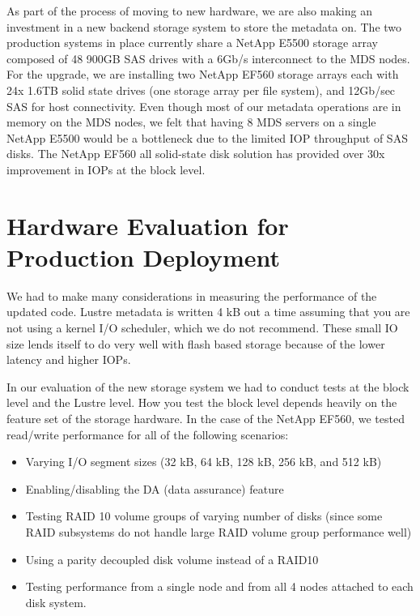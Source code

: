 \documentclass[conference,compsoc]{IEEEtran}
\begin{document}
As part of the process of moving to new hardware, we are also making an
investment in a new backend storage system to store the metadata on. The two
production systems in place currently share a NetApp E5500 storage array
composed of 48 900GB SAS drives with a 6Gb/s interconnect to the MDS nodes. For
the upgrade, we are installing two NetApp EF560 storage arrays each with 24x
1.6TB solid state drives (one storage array per file system), and 12Gb/sec SAS
for host connectivity. Even though most of our metadata operations are in
memory on the MDS nodes, we felt that having 8 MDS servers on a single NetApp
E5500 would be a bottleneck due to the limited IOP throughput of SAS disks. The
NetApp EF560 all solid-state disk solution has provided over 30x improvement in
IOPs at the block level.

\section{Hardware Evaluation for Production Deployment}

We had to make many considerations in measuring the performance of the updated
code. Lustre metadata is written 4 kB out a time assuming that you are not
using a kernel I/O scheduler, which we do not recommend. These small IO size
lends itself to do very well with flash based storage because of the lower
latency and higher IOPs.

In our evaluation of the new storage system we had to conduct tests at the
block level and the Lustre level. How you test the block level depends heavily
on the feature set of the storage hardware. In the case of the NetApp EF560, we
tested read/write performance for all of the following scenarios:

\begin{itemize}

\item Varying I/O segment sizes (32 kB, 64 kB, 128 kB, 256 kB, and 512 kB)

\item Enabling/disabling the DA (data assurance) feature

\item Testing RAID 10 volume groups of varying number of disks (since some RAID subsystems do not handle large RAID volume group performance well)

\item Using a parity decoupled disk volume instead of a RAID10

\item Testing performance from a single node and from all 4 nodes attached to each disk system.

\end{itemize}
\end{document}
